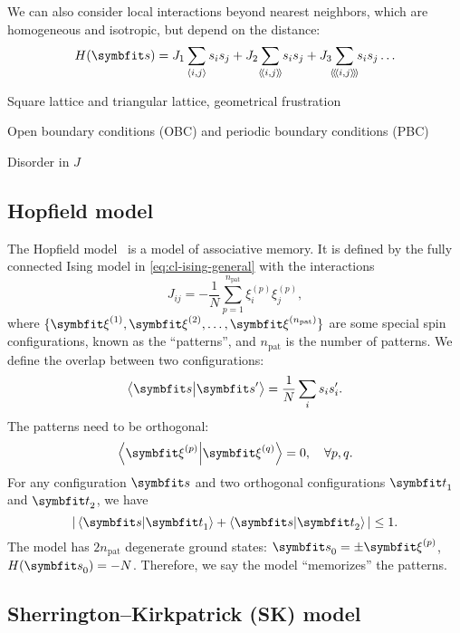 We can also consider local interactions beyond nearest neighbors, which are homogeneous and isotropic, but depend on the distance:
\begin{equation}
H(\vs) = J_1 \sum_{\langle i, j \rangle} s_i s_j + J_2\!\sum_{\llangle i, j \rrangle}\!s_i s_j + J_3\!\!\sum_{\langle\!\langle\!\langle i, j \rangle\!\rangle\!\rangle}\!\!s_i s_j \ldots
\label{eq:cl-ising-nnn}
\end{equation}

Square lattice and triangular lattice, geometrical frustration

Open boundary conditions (OBC) and periodic boundary conditions (PBC)

Disorder in $J$

\subsection{Hopfield model}
\label{sec:hopfield}

The Hopfield model~\cite{hopfield1982neural, amit1985spin} is a model of associative memory. It is defined by the fully connected Ising model in \cref{eq:cl-ising-general} with the interactions
\begin{equation}
J_{i j} = -\frac{1}{N} \sum_{p = 1}^{n_\text{pat}} \xi^{(p)}_i \xi^{(p)}_j,
\label{eq:hopfield}
\end{equation}
where $\{\vxi^{(1)}, \vxi^{(2)}, \ldots, \vxi^{(n_\text{pat})}\}$ are some special spin configurations, known as the ``patterns'', and $n_\text{pat}$ is the number of patterns. We define the overlap between two configurations:
\begin{equation}
\ip{\vs}{\vs'} = \frac{1}{N} \sum_i s_i s'_i.
\label{eq:cl-overlap}
\end{equation}
The patterns need to be orthogonal:
\begin{equation}
\ip{\vxi^{(p)}}{\vxi^{(q)}} = 0, \quad \forall p, q.
\label{eq:cl-ortho}
\end{equation}
For any configuration $\vs$ and two orthogonal configurations $\vt_1$ and $\vt_2$, we have
\begin{equation}
|\ip{\vs}{\vt_1} + \ip{\vs}{\vt_2}| \le 1.
\end{equation}
The model has $2 n_\text{pat}$ degenerate ground states: $\vs_0 = \pm \vxi^{(p)}$, $H(\vs_0) = -N$. Therefore, we say the model ``memorizes'' the patterns.

\subsection{Sherrington--Kirkpatrick (SK) model}
\label{sec:sk}

